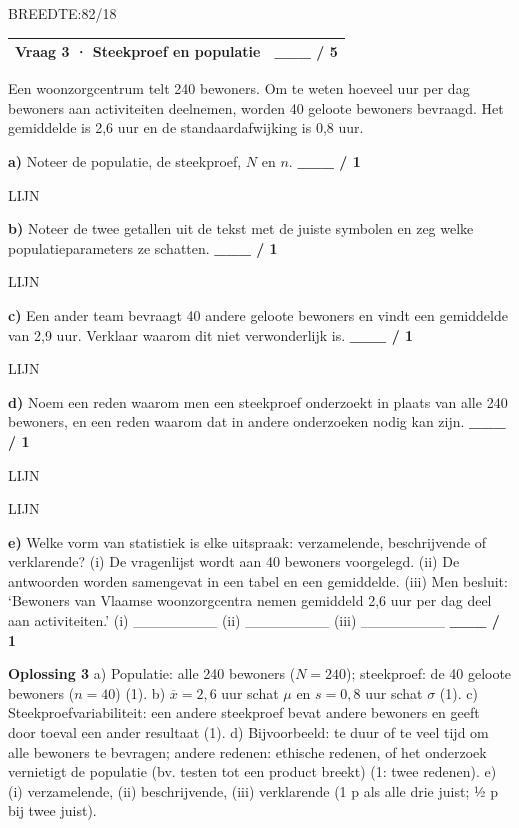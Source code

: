 \documentclass{article}
\newcommand{\lijn}{\par LIJN\par}
\newcommand{\breedtes}[1]{\par BREEDTE:#1\par}
\begin{document}
\breedtes{82/18}
\begin{tabular}{lc}
\hline
Vraag 3 · Steekproef en populatie & \_\_\_ / 5 \\
\hline
\end{tabular}

Een woonzorgcentrum telt 240 bewoners. Om te weten hoeveel uur per dag bewoners aan activiteiten deelnemen, worden 40 geloote bewoners bevraagd. Het gemiddelde is 2,6 uur en de standaardafwijking is 0,8 uur.

\textbf{a)} Noteer de populatie, de steekproef, $N$ en $n$. \hfill \textbf{\_\_\_ / 1} \lijn 

\textbf{b)} Noteer de twee getallen uit de tekst met de juiste symbolen en zeg welke populatieparameters ze schatten. \hfill \textbf{\_\_\_ / 1} \lijn 

\textbf{c)} Een ander team bevraagt 40 andere geloote bewoners en vindt een gemiddelde van 2,9 uur. Verklaar waarom dit niet verwonderlijk is. \hfill \textbf{\_\_\_ / 1} \lijn 

\textbf{d)} Noem een reden waarom men een steekproef onderzoekt in plaats van alle 240 bewoners, en een reden waarom dat in andere onderzoeken nodig kan zijn. \hfill \textbf{\_\_\_ / 1} \lijn \lijn 

\textbf{e)} Welke vorm van statistiek is elke uitspraak: verzamelende, beschrijvende of verklarende? (i) De vragenlijst wordt aan 40 bewoners voorgelegd. (ii) De antwoorden worden samengevat in een tabel en een gemiddelde. (iii) Men besluit: ‘Bewoners van Vlaamse woonzorgcentra nemen gemiddeld 2,6 uur per dag deel aan activiteiten.’ (i) \_\_\_\_\_\_\_\_ (ii) \_\_\_\_\_\_\_\_ (iii) \_\_\_\_\_\_\_\_ \hfill \textbf{\_\_\_ / 1} 

\begin{oplossing}
\textbf{Oplossing 3} \quad a) Populatie: alle 240 bewoners ($N=240$); steekproef: de 40 geloote bewoners ($n=40$) (1). b) $\overline{x}=2{,}6$ uur schat $\mu$ en $s=0{,}8$ uur schat $\sigma$ (1). c) Steekproefvariabiliteit: een andere steekproef bevat andere bewoners en geeft door toeval een ander resultaat (1). d) Bijvoorbeeld: te duur of te veel tijd om alle bewoners te bevragen; andere redenen: ethische redenen, of het onderzoek vernietigt de populatie (bv. testen tot een product breekt) (1: twee redenen). e) (i) verzamelende, (ii) beschrijvende, (iii) verklarende (1 p als alle drie juist; ½ p bij twee juist).
\end{oplossing}
\end{document}
